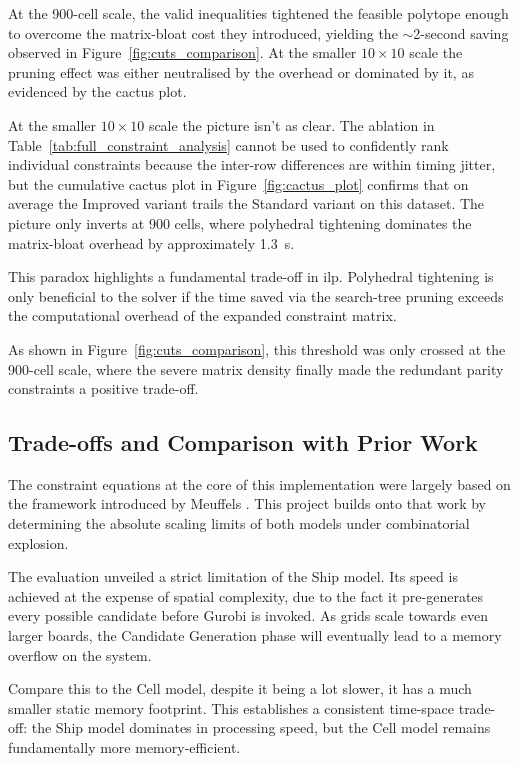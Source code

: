 At the 900-cell scale, the valid inequalities tightened the feasible polytope enough to overcome the matrix-bloat cost they introduced, yielding the $\sim$2-second saving observed in Figure~\ref{fig:cuts_comparison}. At the smaller $10 \times 10$ scale the pruning effect was either neutralised by the overhead or dominated by it, as evidenced by the cactus plot.

At the smaller $10 \times 10$ scale the picture isn't as clear. The ablation in Table~\ref{tab:full_constraint_analysis} cannot be used to confidently rank individual constraints because the inter-row differences are within timing jitter, but the cumulative cactus plot in Figure~\ref{fig:cactus_plot} confirms that on average the Improved variant trails the Standard variant on this dataset. The picture only inverts at \num{900} cells, where polyhedral tightening dominates the matrix-bloat overhead by approximately \SI{1.3}{\second}.

This paradox highlights a fundamental trade-off in \gls{ilp}. Polyhedral tightening is only beneficial to the solver if the time saved via the search-tree pruning exceeds the computational overhead of the expanded constraint matrix. 

As shown in Figure~\ref{fig:cuts_comparison}, this threshold was only crossed at the 900-cell scale, where the severe matrix density finally made the redundant parity constraints a positive trade-off.

\subsection{Trade-offs and Comparison with Prior Work}\label{subsec:tradeoffs-comparison-prior-work}
The constraint equations at the core of this implementation were largely based on the framework introduced by Meuffels \citep{meuffels-battleship}. This project builds onto that work by determining the absolute scaling limits of both models under combinatorial explosion.

The evaluation unveiled a strict limitation of the Ship model. Its speed is achieved at the expense of spatial complexity, due to the fact it pre-generates every possible candidate before Gurobi is invoked. As grids scale towards even larger boards, the Candidate Generation phase will eventually lead to a memory overflow on the system. 

Compare this to the Cell model, despite it being a lot slower, it has a much smaller static memory footprint. This establishes a consistent time-space trade-off: the Ship model dominates in processing speed, but the Cell model remains fundamentally more memory-efficient.

